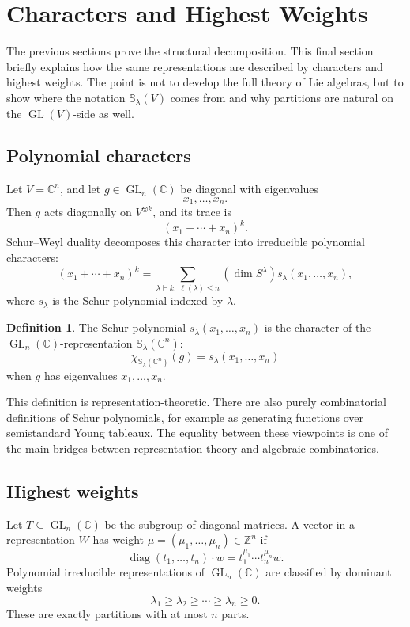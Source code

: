 \documentclass[12pt,a4paper]{article}
\theoremstyle{definition}
\newtheorem{definition}[theorem]{Definition}
\theoremstyle{remark}
\newcommand{\C}{\mathbb{C}}
\newcommand{\Z}{\mathbb{Z}}
\newcommand{\GL}{\operatorname{GL}}
\newcommand{\Schur}[1]{\mathbb{S}_{#1}}
\begin{document}
\section{Characters and Highest Weights}

The previous sections prove the structural decomposition.  This final
section briefly explains how the same representations are described by
characters and highest weights.  The point is not to develop the full theory
of Lie algebras, but to show where the notation \(\Schur{\lambda}(V)\) comes
from and why partitions are natural on the \(\GL(V)\)-side as well.

\subsection{Polynomial characters}

Let \(V=\C^n\), and let \(g\in \GL_n(\C)\) be diagonal with eigenvalues
\[
x_1,\dots,x_n.
\]
Then \(g\) acts diagonally on \(V^{\otimes k}\), and its trace is
\[
(x_1+\cdots+x_n)^k.
\]
Schur--Weyl duality decomposes this character into irreducible polynomial
characters:
\[
(x_1+\cdots+x_n)^k
  =
  \sum_{\lambda\vdash k,\ \ell(\lambda)\le n}
  (\dim S^\lambda)s_\lambda(x_1,\dots,x_n),
\]
where \(s_\lambda\) is the Schur polynomial indexed by \(\lambda\).

\begin{definition}
The Schur polynomial \(s_\lambda(x_1,\dots,x_n)\) is the character of the
\(\GL_n(\C)\)-representation \(\Schur{\lambda}(\C^n)\):
\[
\chi_{\Schur{\lambda}(\C^n)}(g)=s_\lambda(x_1,\dots,x_n)
\]
when \(g\) has eigenvalues \(x_1,\dots,x_n\).
\end{definition}

This definition is representation-theoretic.  There are also purely
combinatorial definitions of Schur polynomials, for example as generating
functions over semistandard Young tableaux.  The equality between these
viewpoints is one of the main bridges between representation theory and
algebraic combinatorics.

\subsection{Highest weights}

Let \(T\subseteq \GL_n(\C)\) be the subgroup of diagonal matrices.  A vector
in a representation \(W\) has weight \(\mu=(\mu_1,\dots,\mu_n)\in\Z^n\) if
\[
\operatorname{diag}(t_1,\dots,t_n)\cdot w
  =
  t_1^{\mu_1}\cdots t_n^{\mu_n}w.
\]
Polynomial irreducible representations of \(\GL_n(\C)\) are classified by
dominant weights
\[
\lambda_1\ge \lambda_2\ge \cdots\ge \lambda_n\ge 0.
\]
These are exactly partitions with at most \(n\) parts.
\end{document}
